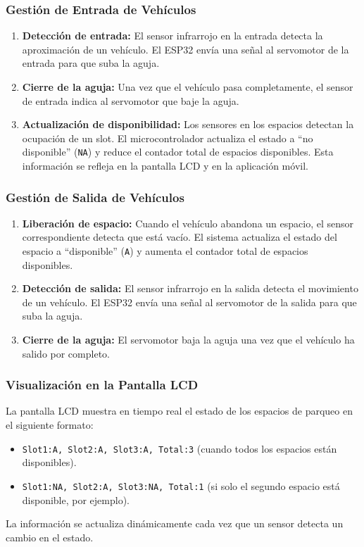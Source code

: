 \documentclass[12pt,a4paper]{article}
\begin{document}
\subsubsection{Gestión de Entrada de Vehículos}
\begin{enumerate}
    \item \textbf{Detección de entrada:}  
    El sensor infrarrojo en la entrada detecta la aproximación de un vehículo. El ESP32 envía una señal al servomotor de la entrada para que suba la aguja. 

    \item \textbf{Cierre de la aguja:}  
    Una vez que el vehículo pasa completamente, el sensor de entrada indica al servomotor que baje la aguja.
    
    \item \textbf{Actualización de disponibilidad:}  
    Los sensores en los espacios detectan la ocupación de un slot. El microcontrolador actualiza el estado a ``no disponible'' (\texttt{NA}) y reduce el contador total de espacios disponibles. Esta información se refleja en la pantalla LCD y en la aplicación móvil.
    

\end{enumerate}

\subsubsection{Gestión de Salida de Vehículos}
\begin{enumerate}
    \item \textbf{Liberación de espacio:}  
    Cuando el vehículo abandona un espacio, el sensor correspondiente detecta que está vacío. El sistema actualiza el estado del espacio a ``disponible'' (\texttt{A}) y aumenta el contador total de espacios disponibles.
    
    \item \textbf{Detección de salida:}  
    El sensor infrarrojo en la salida detecta el movimiento de un vehículo. El ESP32 envía una señal al servomotor de la salida para que suba la aguja.
    
    \item \textbf{Cierre de la aguja:}  
    El servomotor baja la aguja una vez que el vehículo ha salido por completo.
\end{enumerate}

\subsubsection{Visualización en la Pantalla LCD}
La pantalla LCD muestra en tiempo real el estado de los espacios de parqueo en el siguiente formato:
\begin{itemize}
    \item \texttt{Slot1:A, Slot2:A, Slot3:A, Total:3} (cuando todos los espacios están disponibles).
    \item \texttt{Slot1:NA, Slot2:A, Slot3:NA, Total:1} (si solo el segundo espacio está disponible, por ejemplo).
\end{itemize}
La información se actualiza dinámicamente cada vez que un sensor detecta un cambio en el estado.
\end{document}
